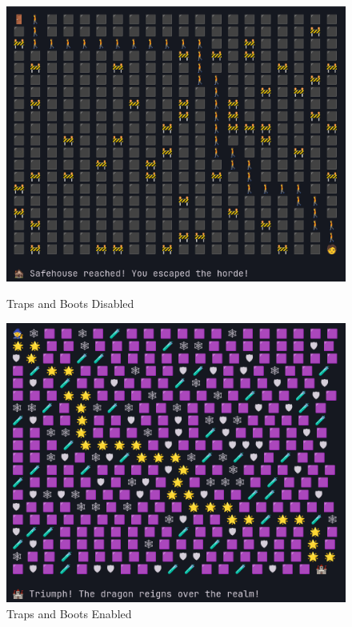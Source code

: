 \documentclass{article}
\begin{document}
\begin{itemize}
\begin{figure}[h]
    \centering
    \begin{minipage}{0.45\textwidth}
        \centering
        \includegraphics[width=\textwidth]{False.png}
        \caption{Traps and Boots Disabled}
        \label{fig:traps_boots_disabled}
    \end{minipage}
    \hfill
    \begin{minipage}{0.45\textwidth}
        \centering
        \includegraphics[width=\textwidth]{True.png}
        \caption{Traps and Boots Enabled}
        \label{fig:traps_boots_enabled}
    \end{minipage}
\end{figure}


\end{itemize}
\end{document}
